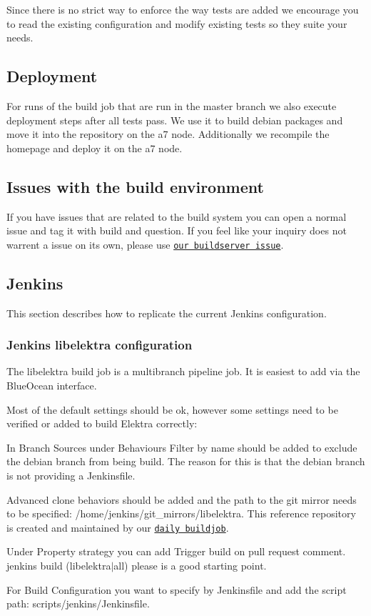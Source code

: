 Since there is no strict way to enforce the way tests are added we encourage you to read the existing configuration and modify existing tests so they suite your needs.

\subsection*{Deployment}

For runs of the build job that are run in the master branch we also execute deployment steps after all tests pass. We use it to build debian packages and move it into the repository on the a7 node. Additionally we recompile the homepage and deploy it on the a7 node.

\subsection*{Issues with the build environment}

If you have issues that are related to the build system you can open a normal issue and tag it with {\ttfamily build} and {\ttfamily question}. If you feel like your inquiry does not warrent a issue on its own, please use \href{https://issues.libelektra.org/160}{\tt our buildserver issue}.

\subsection*{Jenkins}

This section describes how to replicate the current Jenkins configuration.

\subsubsection*{Jenkins libelektra configuration}

The {\ttfamily libelektra} build job is a multibranch pipeline job. It is easiest to add via the Blue\+Ocean interface.

Most of the default settings should be ok, however some settings need to be verified or added to build Elektra correctly\+:
\begin{DoxyItemize}
\item In Branch Sources under Behaviours {\ttfamily Filter by name} should be added to exclude the {\ttfamily debian} branch from being build. The reason for this is that the {\ttfamily debian} branch is not providing a Jenkinsfile.
\item {\ttfamily Advanced clone behaviors} should be added and the path to the git mirror needs to be specified\+: {\ttfamily /home/jenkins/git\+\_\+mirrors/libelektra}. This reference repository is created and maintained by our \href{https://build.libelektra.org/jenkins/job/libelektra-daily/}{\tt daily buildjob}.
\item Under Property strategy you can add {\ttfamily Trigger build on pull request comment}. {\ttfamily jenkins build (libelektra$\vert$all) please} is a good starting point.
\item For Build Configuration you want to specify {\ttfamily by Jenkinsfile} and add the script path\+: {\ttfamily scripts/jenkins/\+Jenkinsfile}.
\end{DoxyItemize}

